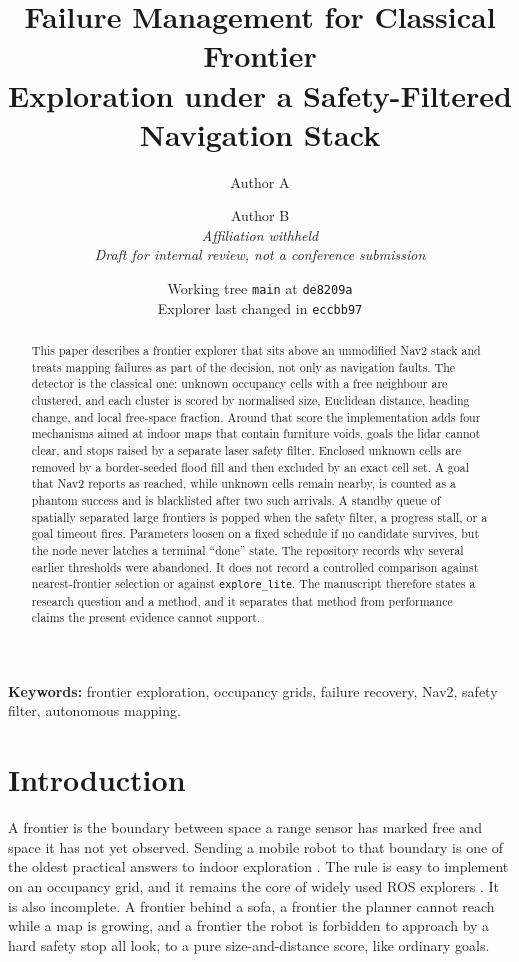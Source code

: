 \documentclass[11pt]{article}
\title{Failure Management for Classical Frontier\\Exploration under a Safety-Filtered Navigation Stack}
\author{Author A \and Author B\\[0.4em]
\textit{Affiliation withheld}\\
\textit{Draft for internal review, not a conference submission}}
\date{Working tree \texttt{main} at \texttt{de8209a}\\Explorer last changed in \texttt{eccbb97}}
\begin{document}
\maketitle

\begin{abstract}
This paper describes a frontier explorer that sits above an unmodified Nav2 stack and treats mapping failures as part of the decision, not only as navigation faults. The detector is the classical one: unknown occupancy cells with a free neighbour are clustered, and each cluster is scored by normalised size, Euclidean distance, heading change, and local free-space fraction. Around that score the implementation adds four mechanisms aimed at indoor maps that contain furniture voids, goals the lidar cannot clear, and stops raised by a separate laser safety filter. Enclosed unknown cells are removed by a border-seeded flood fill and then excluded by an exact cell set. A goal that Nav2 reports as reached, while unknown cells remain nearby, is counted as a phantom success and is blacklisted after two such arrivals. A standby queue of spatially separated large frontiers is popped when the safety filter, a progress stall, or a goal timeout fires. Parameters loosen on a fixed schedule if no candidate survives, but the node never latches a terminal ``done'' state. The repository records why several earlier thresholds were abandoned. It does not record a controlled comparison against nearest-frontier selection or against \texttt{explore\_lite}. The manuscript therefore states a research question and a method, and it separates that method from performance claims the present evidence cannot support.
\end{abstract}

\noindent\textbf{Keywords:} frontier exploration, occupancy grids, failure recovery, Nav2, safety filter, autonomous mapping.

\section{Introduction}
A frontier is the boundary between space a range sensor has marked free and space it has not yet observed. Sending a mobile robot to that boundary is one of the oldest practical answers to indoor exploration \cite{yamauchi1997}. The rule is easy to implement on an occupancy grid, and it remains the core of widely used ROS explorers \cite{horner2016}. It is also incomplete. A frontier behind a sofa, a frontier the planner cannot reach while a map is growing, and a frontier the robot is forbidden to approach by a hard safety stop all look, to a pure size-and-distance score, like ordinary goals.
\end{document}
